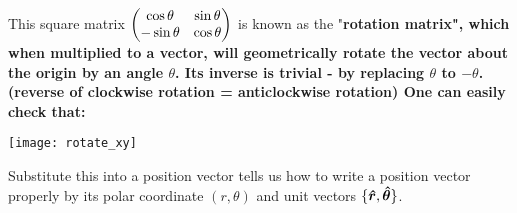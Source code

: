 \documentclass[class=article, crop=false, 12pt]{standalone}
\begin{document}
This square matrix $\begin{pmatrix} \cos\theta & \sin\theta \\ -\sin\theta & \cos\theta \end{pmatrix}$ is known as the "\bf{rotation matrix}", 
which when multiplied to a vector, 
will geometrically rotate the vector about the origin by an angle $\theta$. 
Its inverse is trivial - 
by replacing $\theta$ to $-\theta$. 
(reverse of clockwise rotation = anticlockwise rotation)
One can easily check that:

\begin{center}
    \begin{minipage}{0.7\linewidth}
        \centering
        \texttt{[image: rotate\_xy]}
    \end{minipage}
\end{center}

Substitute this into a position vector tells us how to write a position vector properly
 by its polar coordinate $(r, \theta)$ and unit vectors $\{\vu*{r}, \vu*{\theta}\}$.
\end{document}
